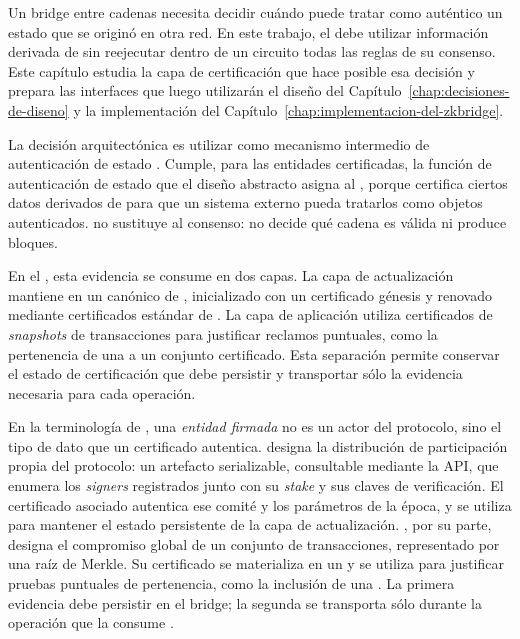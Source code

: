 
Un bridge entre cadenas necesita decidir cuándo puede tratar como auténtico un estado que se originó en otra red. En este trabajo, el \zkBridge debe utilizar información derivada de \Cardano sin reejecutar dentro de un circuito \ZK todas las reglas de su consenso. Este capítulo estudia la capa de certificación que hace posible esa decisión y prepara las interfaces que luego utilizarán el diseño del Capítulo~\ref{chap:decisiones-de-diseno} y la implementación del Capítulo~\ref{chap:implementacion-del-zkbridge}.

La decisión arquitectónica es utilizar \Mithril como mecanismo intermedio de autenticación de estado \cite{cryptoeprint:2021/916,MithrilDocsOverview}. Cumple, para las entidades certificadas, la función de autenticación de estado que el diseño abstracto asigna al \LightClient, porque certifica ciertos datos derivados de \Cardano para que un sistema externo pueda tratarlos como objetos autenticados. \Mithril no sustituye al consenso: no decide qué cadena es válida ni produce bloques.

En el \zkBridge, esta evidencia se consume en dos capas. La capa de actualización mantiene en \ChainB un \UTxO canónico de \StakeDistribution, inicializado con un certificado génesis y renovado mediante certificados estándar de \Mithril. La capa de aplicación utiliza certificados de \textit{snapshots} de transacciones para justificar reclamos puntuales, como la pertenencia de una \LockTx a un conjunto certificado. Esta separación permite conservar el estado de certificación que debe persistir y transportar sólo la evidencia necesaria para cada operación.

En la terminología de \Mithril, una \emph{entidad firmada} no es un actor del protocolo, sino el tipo de dato que un certificado autentica. \MithrilStakeDistribution designa la distribución de participación propia del protocolo: un artefacto serializable, consultable mediante la API, que enumera los \textit{signers} registrados junto con su \textit{stake} y sus claves de verificación. El certificado asociado autentica ese comité y los parámetros de la época, y se utiliza para mantener el estado persistente de la capa de actualización. \CardanoTransactions, por su parte, designa el compromiso global de un conjunto de transacciones, representado por una raíz de Merkle. Su certificado se materializa en un \TransactionSnapshotCertificate y se utiliza para justificar pruebas puntuales de pertenencia, como la inclusión de una \LockTx. La primera evidencia debe persistir en el bridge; la segunda se transporta sólo durante la operación que la consume \cite{MithrilDocsOverview,MithrilDocsTransactions}.

